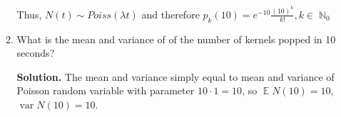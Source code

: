 \documentclass[a4paper, 12pt]{article}
\DeclareMathOperator{\N}{\mathbb{N}}
\DeclareMathOperator{\E}{\mathbb{E}}
\DeclareMathOperator{\var}{var}
\newcommand{\task}[2]{
    \item #1
    \begin{mdframed} \textbf{Solution. } #2 \end{mdframed}
}
\begin{document}
\begin{enumerate}
\begin{enumerate}
{                  Thus, $N(t) \sim Poiss(\lambda t)$ and therefore
                  $p_k(10) = e^{-10} \frac{(10)^k}{k!}, k \in \N_0$
              }
              \task{What is the mean and variance of of the number of kernels popped in 10 seconds?}
              {
                  The mean and variance simply equal to mean and variance of
                  Poisson random variable with parameter $10 \cdot 1 = 10$, so
                  $\E N(10) = 10$, $\var N(10) = 10$.
              }
          \end{enumerate}
\end{enumerate}
\end{document}

